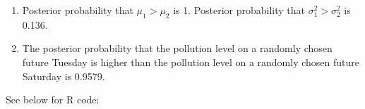 \documentclass{article}
\begin{document}
\begin{enumerate}
\begin{center}
\end{center}

\item Posterior probability that $\mu_1>\mu_2$ is 1. Posterior probability that $\sigma_1^2 > \sigma_2^2$ is 0.136.

\item The posterior probability that the pollution level on a randomly chosen future Tuesday is higher than the pollution level on a randomly chosen future Saturday is 0.9579.


\end{enumerate}

\pagebreak

See below for R code:
\end{document}
